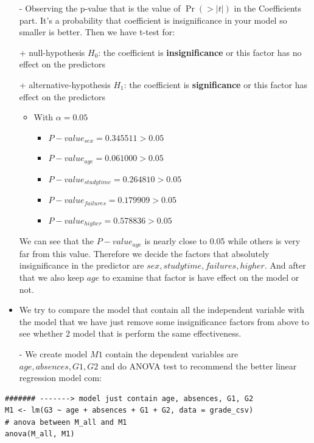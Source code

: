 \documentclass[a4paper]{article}
\numberwithin{equation}{section}
\begin{document}
\begin{itemize}
  \item[-] Observing the p-value that is the value of \(\Pr(>|t|)\) in the Coefficients part. It's a probability that coefficient is insignificance in your model so smaller is better. Then we have t-test for:
\end{itemize}
\begin{itemize}
  \item[+] null-hypothesis \(H_{0}\): the coefficient is \textbf{insignificance} or this factor has no effect on the predictors
  \item[+] alternative-hypothesis \(H_{1}\): the coefficient is \textbf{significance} or this factor has effect on the predictors
        \begin{itemize}
          \item With \(\alpha = 0.05\)
                \begin{itemize}
                  \item \(P-value_{sex} = 0.345511 > 0.05\)
                  \item \(P-value_{age} = 0.061000 > 0.05\)
                  \item \(P-value_{studytime} = 0.264810 > 0.05\)
                  \item \(P-value_{failures} = 0.179909 > 0.05\)
                  \item \(P-value_{higher} = 0.578836 > 0.05\)
                \end{itemize}
        \end{itemize}

        We can see that the \(P-value_{age}\) is nearly close to 0.05 while others is very far from this value. Therefore we decide the factors that absolutely insignificance in the predictor are \(sex, studytime, failures, higher\). And after that we also keep \(age\) to examine that factor is have effect on the model or not.
\end{itemize}

\begin{itemize}
  \item We try to compare the model that contain all the independent variable with the model that we have just remove some insignificance factors from above to see whether 2 model that is perform the same effectiveness.
\end{itemize}
\begin{itemize}
  \item[-] We create model \(M1\) contain the dependent variables are \(age, absences, G1, G2\) and do ANOVA test to recommend the better linear regression model com:
\end{itemize}
\begin{mdframed}[leftline=false,rightline=false,backgroundcolor=magenta!10,nobreak=true]
  \begin{verbatim}
####### -------> model just contain age, absences, G1, G2
M1 <- lm(G3 ~ age + absences + G1 + G2, data = grade_csv)
# anova between M_all and M1
anova(M_all, M1)
  \end{verbatim}
\end{mdframed}
\end{document}
